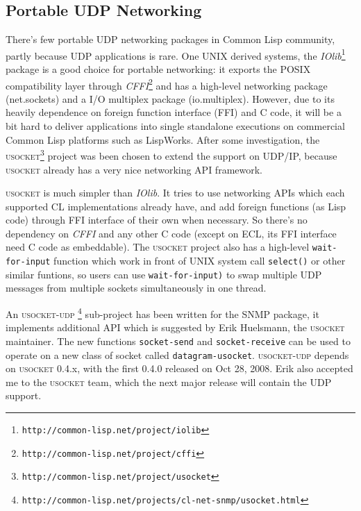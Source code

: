 \documentclass[reprint,natbib,9pt]{sigplanconf}
\begin{document}

\subsection{Portable UDP Networking}

There's few portable UDP networking packages in Common Lisp community,
partly because UDP applications is rare. One UNIX derived systems, the
\textsl{IOlib}\footnote{\texttt{http://common-lisp.net/project/iolib}}
package is a good choice for portable networking: it exports the POSIX
compatibility layer through
\textsl{CFFI}\footnote{\texttt{http://common-lisp.net/project/cffi}}
and has a high-level networking package (net.sockets) and a I/O
multiplex package (io.multiplex). However, due to its heavily dependence
on foreign function interface (FFI) and C code, it will be a bit hard
to deliver applications into single standalone executions on commercial
Common Lisp platforms such as LispWorks. After some investigation,
the \textsc{usocket}\footnote{\texttt{http://common-lisp.net/project/usocket}}
project was been chosen to extend the support on UDP/IP, because \textsc{usocket}
already has a very nice networking API framework.

\textsc{usocket} is much simpler than \textsl{IOlib}. It tries to use
networking APIs which each supported CL implementations already have, and
add foreign functions (as Lisp code) through FFI interface of their own when
necessary. So there's no dependency on \textsl{CFFI} and any other C
code (except on ECL, its FFI interface need C code as embeddable). The
\textsc{usocket} project also has a high-level \texttt{wait-for-input}
function which work in front of UNIX system call \texttt{select()}
or other similar funtions, so users can use \texttt{wait-for-input)}
to swap multiple UDP messages from multiple sockets simultaneously
in one thread.

An \textsc{usocket-udp}
\footnote{\texttt{http://common-lisp.net/projects/cl-net-snmp/usocket.html}} sub-project has been written for the SNMP package,
it implements additional API which is suggested by Erik Huelsmann,
the \textsc{usocket} maintainer. The new functions \texttt{socket-send} and
\texttt{socket-receive} can be used to operate on a new class of
socket called \texttt{datagram-usocket}. \textsc{usocket-udp} depends
on \textsc{usocket} 0.4.x, with the first 0.4.0 released on Oct 28,
2008. Erik also accepted me to the \textsc{usocket} team, which the
next major release will contain the UDP support.
\end{document}
